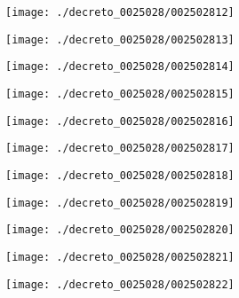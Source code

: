 \begin{figure}[!ht]
    \centering
    \texttt{[image: ./decreto\_0025028/002502812]}
\end{figure}
\clearpage

\begin{figure}[!ht]
    \centering
    \texttt{[image: ./decreto\_0025028/002502813]}
\end{figure}
\clearpage

\begin{figure}[!ht]
    \centering
    \texttt{[image: ./decreto\_0025028/002502814]}
\end{figure}
\clearpage

\begin{figure}[!ht]
    \centering
    \texttt{[image: ./decreto\_0025028/002502815]}
\end{figure}
\clearpage

\begin{figure}[!ht]
    \centering
    \texttt{[image: ./decreto\_0025028/002502816]}
\end{figure}
\clearpage

\begin{figure}[!ht]
    \centering
    \texttt{[image: ./decreto\_0025028/002502817]}
\end{figure}
\clearpage

\begin{figure}[!ht]
    \centering
    \texttt{[image: ./decreto\_0025028/002502818]}
\end{figure}
\clearpage

\begin{figure}[!ht]
    \centering
    \texttt{[image: ./decreto\_0025028/002502819]}
\end{figure}
\clearpage

\begin{figure}[!ht]
    \centering
    \texttt{[image: ./decreto\_0025028/002502820]}
\end{figure}
\clearpage

\begin{figure}[!ht]
    \centering
    \texttt{[image: ./decreto\_0025028/002502821]}
\end{figure}
\clearpage

\begin{figure}[!ht]
    \centering
    \texttt{[image: ./decreto\_0025028/002502822]}
\end{figure}
\clearpage


